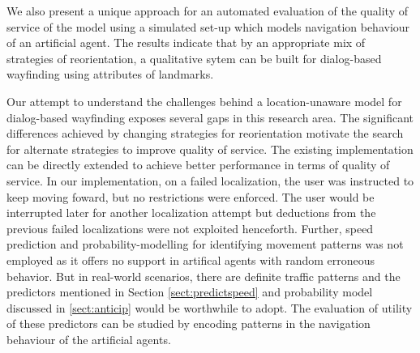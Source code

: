 \documentclass{iitkthesis}
\begin{document}
We also present a unique approach for an automated evaluation of the quality of service of the model using a simulated set-up which models navigation behaviour of an artificial agent. The results indicate that by an appropriate mix of strategies of reorientation, a qualitative sytem can be built for dialog-based wayfinding using attributes of landmarks.

Our attempt to understand the challenges behind a location-unaware model for dialog-based wayfinding exposes several gaps in this research area. The significant differences achieved by changing strategies for reorientation motivate the search for alternate strategies to improve quality of service. The existing implementation can be directly extended to achieve better performance in terms of quality of service. In our implementation, on a failed localization, the user was instructed to keep moving foward, but no restrictions were enforced. The user would be interrupted later for another localization attempt but deductions from the previous failed localizations were not exploited henceforth. Further, speed prediction and probability-modelling for identifying movement patterns was not employed as it offers no support in artifical agents with random erroneous behavior. But in real-world scenarios, there are definite traffic patterns and the predictors mentioned in Section \ref{sect:predictspeed} and probability model discussed in \ref{sect:anticip} would be worthwhile to adopt. The evaluation of utility of these predictors can be studied by encoding patterns in the navigation behaviour of the artificial agents.  
 


\end{document}
